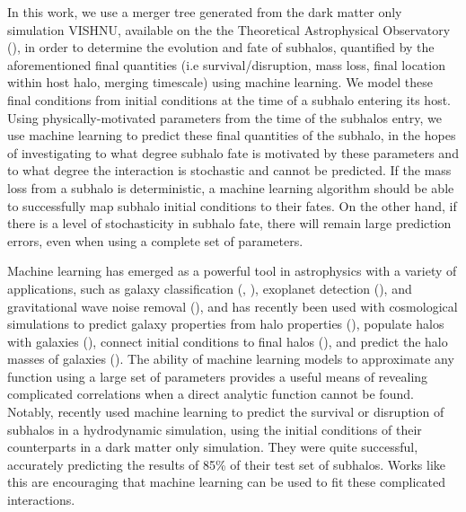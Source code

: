 \documentclass[fleqn,usenatbib]{mnras}
\begin{document}
In this work, we use a merger tree generated from the dark matter only simulation VISHNU, available on the the Theoretical Astrophysical Observatory (\citet{Bernyk2014}), in order to determine the evolution and fate of subhalos, quantified by the aforementioned final quantities (i.e survival/disruption, mass loss, final location within host halo, merging timescale) using machine learning. We model these final conditions from initial conditions at the time of a subhalo entering its host. Using physically-motivated parameters from the time of the subhalos entry, we use machine learning to predict these final quantities of the subhalo, in the hopes of investigating to what degree subhalo fate is motivated by these parameters and to what degree the interaction is stochastic and cannot be predicted. If the mass loss from a subhalo is deterministic, a machine learning algorithm should be able to successfully map subhalo initial conditions to their fates. On the other hand, if there is a level of stochasticity in subhalo fate, there will remain large prediction errors, even when using a complete set of parameters.

Machine learning has emerged as a powerful tool in astrophysics with a variety of applications, such as galaxy classification (\citet{Barchi2019MachineCatalog}, \citet{Nolte2019GalaxyData}), exoplanet detection (\citet{Schanche2018Machine-learningSurveys}), and gravitational wave noise removal (\citet{Cavagli2018FindingLearning}), and has recently been used with cosmological simulations to predict galaxy properties from halo properties (\citet{Kamdar2016}), populate halos with galaxies (\citet{Agarwal2017}), connect initial conditions to final halos (\citet{Lucie-Smith2018}), and predict the halo masses of galaxies (\citet{Calderon2019PredictionApproach}). The ability of machine learning models to approximate any function using a large set of parameters provides a useful means of revealing complicated correlations when a direct analytic function cannot be found. Notably, \citet{Nadler2017} recently used machine learning to predict the survival or disruption of subhalos in a hydrodynamic simulation, using the initial conditions of their counterparts in a dark matter only simulation. They were quite successful, accurately predicting the results of 85\% of their test set of subhalos. Works like this are encouraging that machine learning can be used to fit these complicated interactions. 
\end{document}
